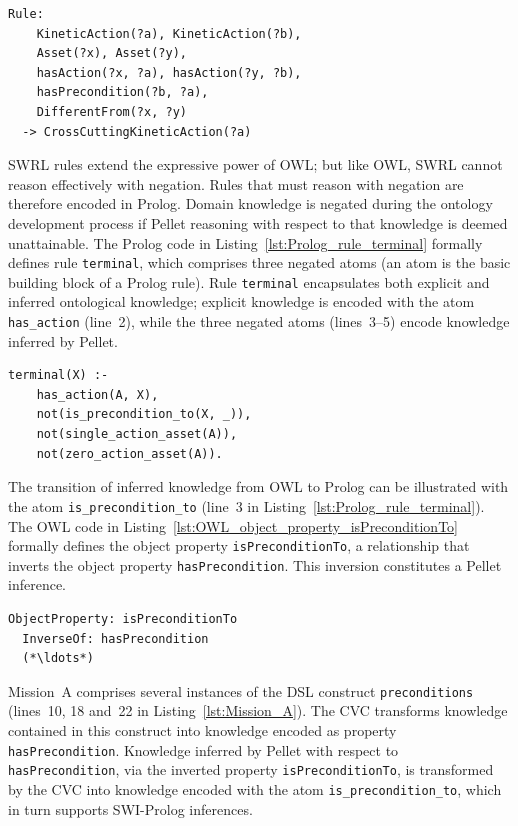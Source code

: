 \begin{lstlisting}[caption={SWRL code for rule CrossCuttingKineticAction},label=lst:SWRL_rule_CrossCuttingKineticAction]
Rule:
    KineticAction(?a), KineticAction(?b),
    Asset(?x), Asset(?y),
    hasAction(?x, ?a), hasAction(?y, ?b),
    hasPrecondition(?b, ?a),
    DifferentFrom(?x, ?y)
  -> CrossCuttingKineticAction(?a)
\end{lstlisting}

SWRL rules extend the expressive power of OWL; but like OWL, SWRL cannot reason effectively with negation. Rules that must reason with negation are therefore encoded in Prolog. Domain knowledge is negated during the ontology development process if Pellet reasoning with respect to that knowledge is deemed unattainable. The Prolog code in Listing~\ref{lst:Prolog_rule_terminal} formally defines rule \texttt{terminal}, which comprises three negated atoms (an atom is the basic building block of a Prolog rule). Rule \texttt{terminal} encapsulates both explicit and inferred ontological knowledge; explicit knowledge is encoded with the atom \texttt{has\_action} (line~2), while the three negated atoms (lines~3--5) encode knowledge inferred by Pellet.

\begin{lstlisting}[caption={Prolog code for rule terminal},label=lst:Prolog_rule_terminal]
terminal(X) :-
    has_action(A, X),
    not(is_precondition_to(X, _)),
    not(single_action_asset(A)),
    not(zero_action_asset(A)).
\end{lstlisting}

The transition of inferred knowledge from OWL to Prolog can be illustrated with the atom \texttt{is\_precondition\_to} (line~3 in Listing~\ref{lst:Prolog_rule_terminal}). The OWL code in Listing~\ref{lst:OWL_object_property_isPreconditionTo} formally defines the object property \texttt{isPreconditionTo}, a relationship that inverts the object property \texttt{hasPrecondition}. This inversion constitutes a Pellet inference.

\begin{lstlisting}[caption={OWL code for the object property isPreconditionTo},label=lst:OWL_object_property_isPreconditionTo]
ObjectProperty: isPreconditionTo
  InverseOf: hasPrecondition
  (*\ldots*)
\end{lstlisting}

Mission~A comprises several instances of the DSL construct \texttt{preconditions} (lines~10, 18 and~22 in Listing~\ref{lst:Mission_A}). The CVC transforms knowledge contained in this construct into knowledge encoded as property \texttt{hasPrecondition}. Knowledge inferred by Pellet with respect to \texttt{hasPrecondition}, via the inverted property \texttt{isPreconditionTo}, is transformed by the CVC into knowledge encoded with the atom \texttt{is\_precon\-dition\_to}, which in turn supports SWI-Prolog inferences.


